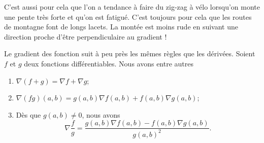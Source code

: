 C'est aussi pour cela que l'on a tendance à faire du zig-zag à vélo lorsqu'on monte une pente très forte et qu'on est fatigué. C'est toujours pour cela que les routes de montagne font de longs lacets. La montée est moins rude en suivant une direction proche d'être perpendiculaire au gradient !

\begin{theorem}
    Le gradient des fonction suit à peu près les mêmes règles que les dérivées. Soient $f$ et $g$ deux fonctions différentiables. Nous avons entre autres
    \begin{enumerate}
        \item
            $\nabla(f+g)=\nabla f+\nabla g$;
        \item
            $\nabla(fg)(a,b)=g(a,b)\nabla f(a,b)+f(a,b)\nabla g(a,b)$;
        \item
            Dès que $g(a,b)\neq 0$, nous avons
            \begin{equation}
                \nabla\frac{ f }{ g }=\frac{ g(a,b)\nabla f(a,b)-f(a,b)\nabla g(a,b) }{ g(a,b)^2 }.
            \end{equation}
    \end{enumerate}
\end{theorem}

